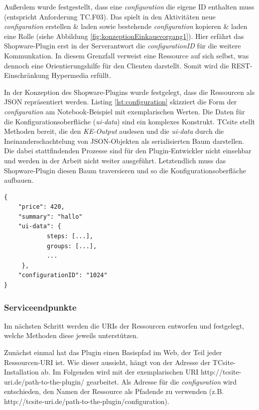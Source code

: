 \documentclass[11pt, a4paper, titlepage, listof=totoc, bibliography=totoc, index=totoc, twoside, openright, headings=normal, draft]{scrreprt}
\begin{document}
Außerdem wurde festgestellt, dass eine \emph{configuration} die eigene ID enthalten muss (entspricht Anforderung TC.F03). Das spielt in den Aktivitäten \glqq neue \emph{configuration} erstellen \& laden\grqq{}  sowie \glqq bestehende \emph{configuration} kopieren \& laden\grqq{} eine Rolle (siehe Abbildung \ref{fig:konzeptionEinkausvorgang1}). Hier erfährt das Shopware-Plugin erst in der Serverantwort die \emph{configurationID} für die weitere Kommunkation. In diesem Grenzfall verweist eine Ressource auf sich selbst, was dennoch eine Orientierungshilfe für den Clienten darstellt. Somit wird die REST-Einschränkung \glqq Hypermedia\grqq{} erfüllt.

In der Konzeption des Shopware-Plugins wurde festgelegt, dass die Ressourcen als JSON repräsentiert werden. Listing \ref{lst:configuration} skizziert die Form der \emph{configuration} am Notebook-Beispiel mit exemplarischen Werten. Die Daten für die Konfigurationsoberfläche (\emph{ui-data}) sind ein komplexes Konstrukt. TCsite stellt Methoden bereit, die den \emph{KE-Output} auslesen und die \emph{ui-data} durch die Ineinanderschachtelung von JSON-Objekten als serialisierten Baum darstellen. Die dabei stattfindenden Prozesse sind für den Plugin-Entwickler nicht einsehbar und werden in der Arbeit nicht weiter ausgeführt. Letztendlich muss das Shopware-Plugin diesen Baum traversieren und so die Konfigurationsoberfläche aufbauen.

\vspace{1em}
\begin{lstlisting}[caption=Beispiel einer configuration, label=lst:configuration]
{
	"price": 420,
	"summary": "hallo"
	"ui-data": {
			steps: [...],
			groups: [...],
			...
	 },
	"configurationID": "1024"
}
\end{lstlisting}

\subsubsection{Serviceendpunkte}
Im nächsten Schritt werden die URIs der Ressourcen entworfen und festgelegt, welche Methoden diese jeweils unterstützen.

Zunächst einmal hat das Plugin einen Basispfad im Web, der Teil jeder Ressourcen-URI ist. Wie dieser aussieht, hängt von der Adresse der TCsite-Installation ab. Im Folgenden wird mit der exemplarischen URI \glqq http://tcsite-uri.de/path-to-the-plugin/\grqq{} gearbeitet. Als Adresse für die \emph{configuration} wird entschieden, den Namen der Ressource als Pfadende zu verwenden (z.B. \glqq http://tcsite-uri.de/path-to-the-plugin/configuration\grqq{}).
\end{document}
